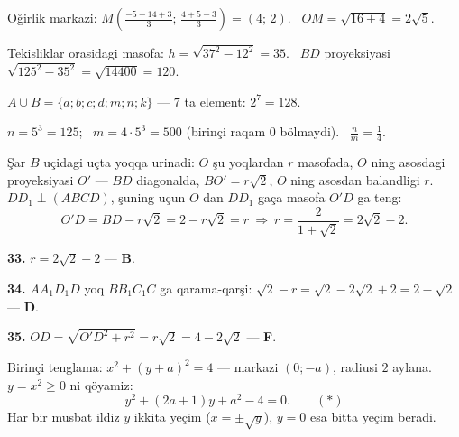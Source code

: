 Oğirlik markazi: $M\left(\frac{-5+14+3}3;\,\frac{4+5-3}3\right)=(4;\,2)$. \ $OM=\sqrt{16+4}=2\sqrt5$.

Tekisliklar orasidagi masofa: $h=\sqrt{37^2-12^2}=35$. \ $BD$ proyeksiyasi $\sqrt{125^2-35^2}=\sqrt{14400}=120$.

$A\cup B=\{a;b;c;d;m;n;k\}$ — $7$ ta element: $2^7=128$.

$n=5^3=125$; \ $m=4\cdot5^3=500$ (birinçi raqam $0$ bölmaydi). \ $\frac nm=\frac14$.

\newpage
{}
Şar $B$ uçidagi uçta yoqqa urinadi: $O$ şu yoqlardan $r$ masofada, $O$ ning asosdagi proyeksiyasi $O'$ — $BD$ diagonalda, $BO'=r\sqrt2$, $O$ ning asosdan balandligi $r$.\\
$DD_1\perp(ABCD)$, şuning uçun $O$ dan $DD_1$ gaça masofa $O'D$ ga teng:
\[O'D=BD-r\sqrt2=2-r\sqrt2=r\ \Rightarrow\ r=\frac2{1+\sqrt2}=2\sqrt2-2.\]

\textbf{33.} $r=2\sqrt2-2$ — \textbf{B}.

\textbf{34.} $AA_1D_1D$ yoq $BB_1C_1C$ ga qarama-qarşi: $\sqrt2-r=\sqrt2-2\sqrt2+2=2-\sqrt2$ — \textbf{D}.

\textbf{35.} $OD=\sqrt{O'D^2+r^2}=r\sqrt2=4-2\sqrt2$ — \textbf{F}.

\newpage
{}
Birinçi tenglama: $x^2+(y+a)^2=4$ — markazi $(0;-a)$, radiusi $2$ aylana. $y=x^2\ge0$ ni qöyamiz:
\[y^2+(2a+1)y+a^2-4=0.\qquad(*)\]
Har bir musbat ildiz $y$ ikkita yeçim ($x=\pm\sqrt y$), $y=0$ esa bitta yeçim beradi.

